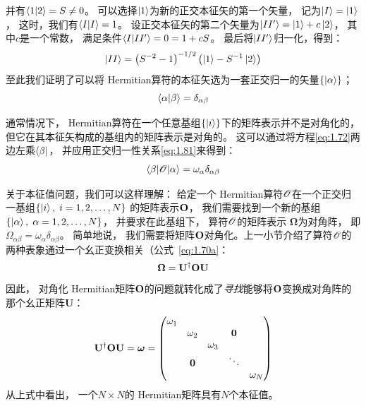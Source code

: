 \begin{enumerate}
 并有$\langle 1 \vert 2 \rangle = S \neq 0$。
 可以选择$\Ket{1}$为新的正交本征矢的第一个矢量，
 记为$\Ket{I} = \Ket{1}$，
 这时，我们有$\langle I \vert I \rangle = 1$。
 设正交本征矢的第二个矢量为$\Ket{II^\prime} = \Ket{1} + c\Ket{2}$，
 其中$c$是一个常数，
 满足条件$\langle I \vert II^\prime \rangle = 0 = 1+cS$。
 最后将$\Ket{II^\prime}$归一化，得到：
 \begin{equation}
     \Ket{II} = \left(S^{-2}-1\right)^{-1/2}\left(\Ket{1}-S^{-1}\Ket{2}\right)
     \label{eq:1.80}
 \end{equation}
 至此我们证明了可以将 Hermitian算符的本征矢选为一套正交归一的矢量$\left\{ \Ket{\alpha} \right\}$；
 \begin{equation}
     \langle \alpha \vert \beta \rangle = \delta_{\alpha\beta}
     \label{eq:1.81}
 \end{equation}
\end{enumerate}

通常情况下，
Hermitian算符在一个任意基组$\left\{ \Ket{i} \right\}$下的矩阵表示并不是对角化的，
但它在其本征矢构成的基组内的矩阵表示是对角的。
这可以通过将方程\eqref{eq:1.72}两边左乘$\Bra{\beta}$，
并应用正交归一性关系\eqref{eq:1.81}来得到：
\begin{equation}
 \left\langle \beta\middle\vert \mathscr{O} \middle\vert \alpha\right\rangle = \omega_\alpha\delta_{\alpha\beta}
 \label{eq:1.82}
\end{equation}

关于本征值问题，我们可以这样理解：
给定一个 Hermitian算符$\mathscr{O}$在一个正交归一基组$\left\{\Ket{i},\; i = 1, 2, \dots, N\right\}$ 的矩阵表示$\mathbf O$，
我们需要找到一个新的基组 $\left\{\Ket{\alpha},\; \alpha = 1, 2, \dots, N\right\}$，
并要求在此基组下，
算符$\mathscr{O}$的矩阵表示 $\boldsymbol\Omega$为对角阵，
即$\Omega_{\alpha\beta} = \omega_\alpha\delta_{\alpha\beta}$。
简单地说，
我们需要将矩阵$\mathbf O$对角化。上一小节介绍了算符$\mathscr{O}$的两种表象通过一个幺正变换相关（公式~\ref{eq:1.70a}：
\[\boldsymbol\Omega = \mathbf U^\dagger\mathbf{O}\mathbf{U}\]
因此，
对角化 Hermitian矩阵$\mathbf O$的问题就转化成了\emph{寻找}能够将$\mathbf O$变换成对角阵的那个幺正矩阵$\mathbf{U}$：
\begin{equation}
 \mathbf U^\dagger\mathbf{O}\mathbf{U} = \boldsymbol\omega = \begin{pmatrix}
     \omega_1     & & & &\\
          &\omega_2 &     &\mathbf{0} &\\
          & &\omega_3 & &\\
          &\mathbf{0} & & \ddots & \\
          & &     & &\omega_N
 \end{pmatrix}
 \label{eq:1.83}
\end{equation}
从上式中看出，
一个$N\times N$的 Hermitian矩阵具有$N$个本征值。

